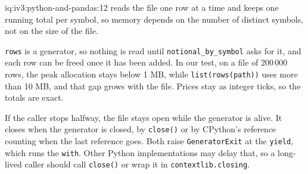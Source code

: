 \begin{solution}{iq:iv3:python-and-pandas:12}
 reads the file one row at a time and keeps one running total per symbol, so memory depends on the number of distinct symbols, not on the size of the file.
\enlargethispage{-3\baselineskip}%
\label{lst:iv3:pp:stream}

\texttt{rows} is a generator, so nothing is read until \texttt{notional\_by\_symbol} asks for it, and each row can be freed once it has been added. In our test, on a file of 200\,000 rows, the peak allocation stays below 1 MB, while \texttt{list(rows(path))} uses more than 10 MB, and that gap grows with the file. Prices stay as integer ticks, so the totals are exact.

If the caller stops halfway, the file stays open while the generator is alive. It closes when the generator is closed, by \texttt{close()} or by CPython's reference counting when the last reference goes. Both raise \texttt{GeneratorExit} at the \texttt{yield}, which runs the \texttt{with}. Other Python implementations may delay that, so a long-lived caller should call \texttt{close()} or wrap it in \texttt{contextlib.closing}.

\end{solution}

